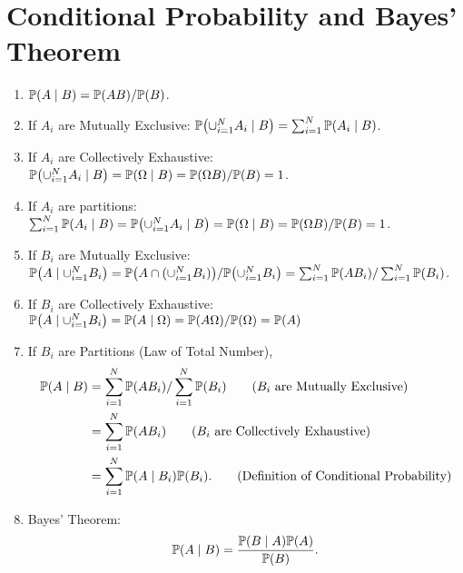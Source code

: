 \section{Conditional Probability and Bayes' Theorem}
\begin{enumerate}
    \item $\condP{A}{B} = \P{AB}/\P{B}$. 
    \item If $A_i$ are Mutually Exclusive: $\condP{\cup_{i=1}^{N}A_i}{B} = \sum_{i=1}^{N}\condP{A_i}{B}$.
    \item If $A_i$ are Collectively Exhaustive: $\condP{\cup_{i=1}^N A_i}{B}=\condP{\Omega}{B}=\P{\Omega B}/\P{B}=1$.
    \item If $A_i$ are partitions: $\sum_{i=1}^{N}\condP{A_i}{B}=\condP{\cup_{i=1}^{N}A_i}{B}=\condP{\Omega}{B}=\P{\Omega B}/\P{B}=1$.
    \item If $B_i$ are Mutually Exclusive: $\condP{A}{\cup_{i=1}^{N}B_i} = \P{A\cap(\cup_{i=1}^N B_i)}/\P{\cup_{i=1}^N B_i}=\sum_{i=1}^{N}\P{AB_i}/\sum_{i=1}^N\P{B_i}$.
    \item If $B_i$ are Collectively Exhaustive: $\condP{A}{\cup_{i=1}^{N}B_i} = \condP{A}{\Omega}=\P{A\Omega}/\P{\Omega}=\P{A}$
    \item If $B_i$ are Partitions (Law of Total Number),
    \begin{align}
        \condP{A}{B}
        &= \sum_{i=1}^{N}\P{AB_i}/\sum_{i=1}^N\P{B_i} \tag{$B_i$ are Mutually Exclusive} \\
        &= \sum_{i=1}^{N}\P{AB_i}  \tag{$B_i$ are Collectively Exhaustive} \\
        &= \sum_{i=1}^{N}\condP{A}{B_i}\P{B_i}. \tag{Definition of Conditional Probability}
    \end{align}
\item Bayes' Theorem:{
    \begin{equation*}
        \condP{A}{B} = \frac{\condP{B}{A}\P{A}}{\P{B}}.
    \end{equation*}
}
\end{enumerate}
